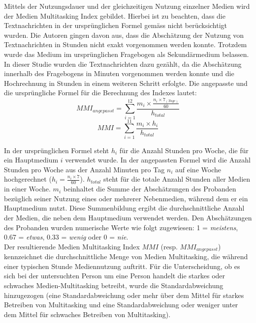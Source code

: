 Mittels der Nutzungsdauer und der gleichzeitigen Nutzung einzelner Medien wird der Medien Multitasking Index gebildet. Hierbei ist zu beachten, dass die Textnachrichten in der ursprünglichen Formel gemäss \cite{Ophir2009}  nicht berücksichtigt wurden. Die Autoren gingen davon aus, dass die Abschätzung der Nutzung von Textnachrichten in Stunden nicht exakt vorgenommen werden konnte. Trotzdem wurde das Medium im ursprünglichen Fragebogen als Sekundärmedium belassen. In dieser Studie wurden die Textnachrichten dazu gezählt, da die Abschätzung innerhalb des Fragebogens in Minuten vorgenommen werden konnte und die Hochrechnung in Stunden in einem weiteren Schritt erfolgte. Die angepasste und die ursprüngliche Formel für die Berechnung des Indexes lautet:
\begin{equation}\label{formula.mmi}
    MMI_{angepasst}=\sum_{i=1}^{12} \frac{m_{i} \times \frac{n_{i} \times 7_{(Tage)}}{60}}{h_{total}}
\end{equation}
\begin{equation}\label{formula.mmi}
    MMI=\sum_{i=1}^{11} \frac{m_{i} \times h_{i}}{h_{total}}
\end{equation}

In der ursprünglichen Formel steht \(h_{i}\) für die Anzahl Stunden pro Woche, die für ein Hauptmedium \(i\) verwendet wurde. In der angepassten Formel wird die Anzahl Stunden pro Woche aus der Anzahl Minuten pro Tag \(n_i\) auf eine Woche hochgerechnet (\(h_{i}=\frac{n_{i} \times 7}{60}\)). \(h_{total}\) steht für die totale Anzahl Stunden aller Medien in einer Woche. \(m_i\) beinhaltet die Summe der Abschätzungen des Probanden bezüglich seiner Nutzung eines oder mehrerer Nebenmedien, während dem er ein Hauptmedium nutzt. Diese Summenbildung ergibt die durchschnittliche Anzahl der Medien, die neben dem Hauptmedium verwendet werden. Den Abschätzungen des Probanden wurden numerische Werte wie folgt zugewiesen: 1 = \textit{meistens}, 0.67 = \textit{etwas}, 0.33 = \textit{wenig} oder 0 = \textit{nie}. \\
Der resultierende Medien Multitasking Index \(MMI\) (resp. \(MMI_{angepasst}\)) kennzeichnet die durchschnittliche Menge von Medien Multitasking, die während einer typischen Stunde Mediennutzung auftritt. Für die Unterscheidung, ob es sich bei der untersuchten Person um eine Person handelt die starkes oder schwaches Medien-Multitasking betreibt, wurde die Standardabweichung hinzugezogen (eine Standardabweichung oder mehr über dem Mittel für starkes Betreiben von Multitasking und eine Standardabweichung oder weniger unter dem Mittel für schwaches Betreiben von Multitasking). 

